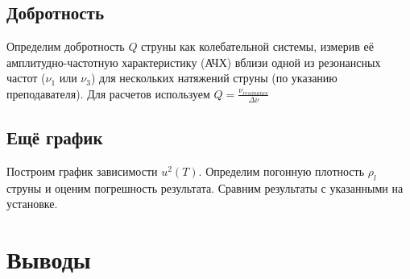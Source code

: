 \documentclass[13pt,a4paper]{article}
\begin{document}
\subsection{Добротность}
Определим добротность $Q$ струны как колебательной системы, измерив её амплитудно-частотную характеристику (АЧХ) вблизи одной из резонансных частот ($\nu_{1}$ или $\nu_{3}$) для нескольких натяжений струны (по указанию преподавателя).
Для расчетов используем $Q=\frac{\nu_{resonance}}{\Delta\nu}$


\subsection{Ещё график}
Построим график зависимости $u^2(T)$. Определим погонную плотность $\rho_{l}$ струны и оценим погрешность результата. Сравним результаты с указанными на установке.


\section{Выводы}
\end{document}
